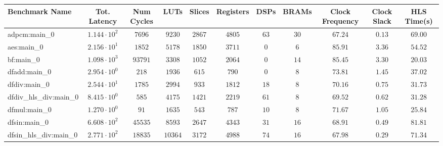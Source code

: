\begin{tabular}{|l|c|c|c|c|c|c|c|c|c|c|}
\hline
Benchmark Name          & Tot. Latency           & Num Cycles & LUTs      & Slices    & Registers & DSPs    & BRAMs   & Clock Frequency & Clock Slack & HLS Time(s) \\
\hline
adpcm:main\_0           & $ 1.144 \cdot 10^{2} $ & $ 7696   $ & $ 9230  $ & $ 2867  $ & $ 4805  $ & $ 63  $ & $ 30  $ & $ 67.24       $ & $ 0.13    $ & $ 69.00   $ \\
aes:main\_0             & $ 2.156 \cdot 10^{1} $ & $ 1852   $ & $ 5178  $ & $ 1850  $ & $ 3711  $ & $ 0   $ & $ 6   $ & $ 85.91       $ & $ 3.36    $ & $ 54.52   $ \\
bf:main\_0              & $ 1.098 \cdot 10^{3} $ & $ 93791  $ & $ 3308  $ & $ 1052  $ & $ 2064  $ & $ 0   $ & $ 14  $ & $ 85.45       $ & $ 3.30    $ & $ 20.03   $ \\
dfadd:main\_0           & $ 2.954 \cdot 10^{0} $ & $ 218    $ & $ 1936  $ & $ 615   $ & $ 790   $ & $ 0   $ & $ 8   $ & $ 73.81       $ & $ 1.45    $ & $ 37.02   $ \\
dfdiv:main\_0           & $ 2.544 \cdot 10^{1} $ & $ 1785   $ & $ 2994  $ & $ 933   $ & $ 1812  $ & $ 18  $ & $ 8   $ & $ 70.16       $ & $ 0.75    $ & $ 31.73   $ \\
dfdiv\_hls\_div:main\_0 & $ 8.415 \cdot 10^{0} $ & $ 585    $ & $ 4175  $ & $ 1421  $ & $ 2219  $ & $ 61  $ & $ 8   $ & $ 69.52       $ & $ 0.62    $ & $ 31.28   $ \\
dfmul:main\_0           & $ 1.270 \cdot 10^{0} $ & $ 91     $ & $ 1635  $ & $ 543   $ & $ 787   $ & $ 10  $ & $ 8   $ & $ 71.67       $ & $ 1.05    $ & $ 25.84   $ \\
dfsin:main\_0           & $ 6.608 \cdot 10^{2} $ & $ 45535  $ & $ 8593  $ & $ 2647  $ & $ 4343  $ & $ 31  $ & $ 16  $ & $ 68.91       $ & $ 0.49    $ & $ 81.81   $ \\
dfsin\_hls\_div:main\_0 & $ 2.771 \cdot 10^{2} $ & $ 18835  $ & $ 10364 $ & $ 3172  $ & $ 4988  $ & $ 74  $ & $ 16  $ & $ 67.98       $ & $ 0.29    $ & $ 71.34   $ \\

\end{tabular}
